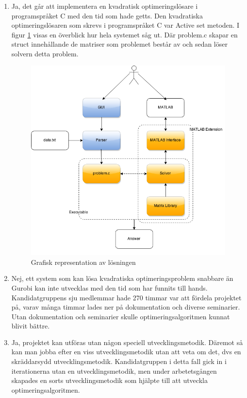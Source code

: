 \begin{enumerate}
\item Ja, det går att implementera en kvadratisk optimeringslösare i programspråket C med den tid som hade getts. Den kvadratiska optimeringslösaren som skrevs i programspråket C var Active set metoden. I figur \ref{fig:arkitektur} visas en överblick hur hela systemet såg ut. Där problem.c skapar en struct innehållande de matriser som problemet består av och sedan löser solvern detta problem.

\begin{figure}[h]
\centerline{\includegraphics[scale=0.5]{grafik/arkitektur}}
\caption{Grafisk representation av lösningen}
\label{fig:arkitektur}
\end{figure}

\item Nej, ett system som kan lösa kvadratiska optimeringsproblem snabbare än Gurobi kan inte utvecklas med den tid som har funnits till hands. Kandidatgruppens sju medlemmar hade 270 timmar var att fördela projektet på, varav många timmar lades ner på dokumentation och diverse seminarier. Utan dokumentation och seminarier skulle optimeringsalgoritmen kunnat blivit bättre.

\item Ja, projektet kan utföras utan någon speciell utvecklingsmetodik. Däremot så kan man jobba efter en viss utvecklingsmetodik utan att veta om det, dvs en skräddarsydd utvecklingsmetodik. Kandidatgruppen i detta fall gick in i iterationerna utan en utvecklingsmetodik, men under arbetetsgången skapades en sorts utvecklingsmetodik som hjälpte till att utveckla optimeringsalgoritmen.
\end{enumerate}
	
